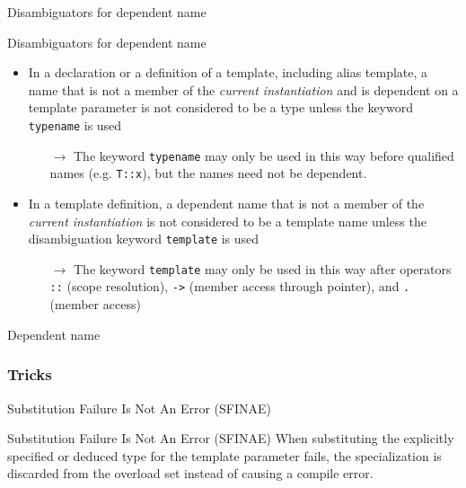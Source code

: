 \begin{frame}{Disambiguators for dependent name}
  \begin{block}{Disambiguators for dependent name}
    \begin{itemize}
    \item
      In a declaration or a definition of a template, including alias template, a name that is not a member of the \emph{current instantiation} and is dependent on a template parameter is not considered to be a type unless the keyword \lstinline!typename! is used
      \begin{itemize}
      \item[$\to$]
        The keyword \lstinline!typename! may only be used in this way before qualified names (e.g. \lstinline!T::x!), but the names need not be dependent.
      \end{itemize}
    \item
      In a template definition, a dependent name that is not a member of the \emph{current instantiation} is not considered to be a template name unless the disambiguation keyword \lstinline!template! is used
        \begin{itemize}
        \item[$\to$]
          The keyword \lstinline!template! may only be used in this way after operators \lstinline!::! (scope resolution), \lstinline!->! (member access through pointer), and \lstinline!.! (member access)
        \end{itemize}
    \end{itemize}
  \end{block}
\end{frame}

\begin{frame}{Dependent name}{}
  \begin{example}
  \end{example}
\end{frame}



\subsubsection{Tricks}

\begin{frame}{Substitution Failure Is Not An Error (SFINAE)}{}
  \begin{block}{Substitution Failure Is Not An Error (SFINAE)}
    When substituting the explicitly specified or deduced type for the template parameter fails, the specialization is discarded from the overload set instead of causing a compile error.
  \end{block}

  \begin{example}[SFINAE]
  \end{example}
\end{frame}

